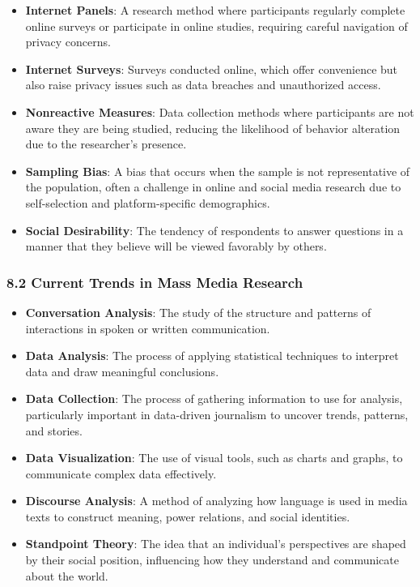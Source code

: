 \documentclass[
]{book}
\providecommand{\tightlist}{%
  \setlength{\itemsep}{0pt}\setlength{\parskip}{0pt}}
\begin{document}
\begin{itemize}
\tightlist
\item
  \textbf{Internet Panels}: A research method where participants regularly complete online surveys or participate in online studies, requiring careful navigation of privacy concerns.
\item
  \textbf{Internet Surveys}: Surveys conducted online, which offer convenience but also raise privacy issues such as data breaches and unauthorized access.
\item
  \textbf{Nonreactive Measures}: Data collection methods where participants are not aware they are being studied, reducing the likelihood of behavior alteration due to the researcher's presence.
\item
  \textbf{Sampling Bias}: A bias that occurs when the sample is not representative of the population, often a challenge in online and social media research due to self-selection and platform-specific demographics.
\item
  \textbf{Social Desirability}: The tendency of respondents to answer questions in a manner that they believe will be viewed favorably by others.
\end{itemize}

\subsubsection*{\texorpdfstring{\textbf{8.2 Current Trends in Mass Media Research}}{8.2 Current Trends in Mass Media Research}}\label{current-trends-in-mass-media-research}

\begin{itemize}
\tightlist
\item
  \textbf{Conversation Analysis}: The study of the structure and patterns of interactions in spoken or written communication.
\item
  \textbf{Data Analysis}: The process of applying statistical techniques to interpret data and draw meaningful conclusions.
\item
  \textbf{Data Collection}: The process of gathering information to use for analysis, particularly important in data-driven journalism to uncover trends, patterns, and stories.
\item
  \textbf{Data Visualization}: The use of visual tools, such as charts and graphs, to communicate complex data effectively.
\item
  \textbf{Discourse Analysis}: A method of analyzing how language is used in media texts to construct meaning, power relations, and social identities.
\item
  \textbf{Standpoint Theory}: The idea that an individual's perspectives are shaped by their social position, influencing how they understand and communicate about the world.
\end{itemize}
\end{document}
